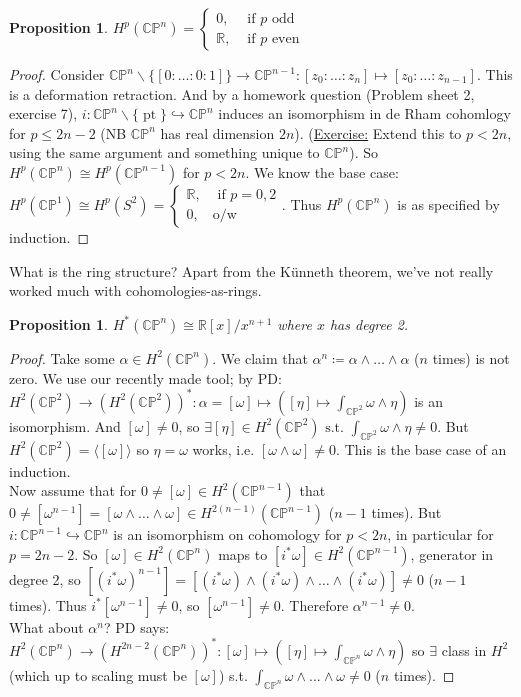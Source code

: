 \documentclass[10pt]{article}
\theoremstyle{plain}
\newtheorem{prop}[thm]{Proposition}
\theoremstyle{definition}
\newcommand{\st}{\text{ s.t. }}
\newcommand{\myif}{\text{ if }}
\newcommand{\Real}{\mathbb{R}}
\newcommand{\CProj}{\mathbb{CP}}
\newcommand{\mycasesthing}[2]{\begin{cases} #1 \\ #2\end{cases}}
\DeclareMathOperator{\pt}{pt}
\begin{document}
\begin{prop}
$H^p(\CProj^n) = \mycasesthing{ 0,& \myif p \text{ odd}}{\Real, & \myif p \text{ even}} $
\end{prop}
\begin{proof}
Consider $\CProj^n \backslash \{ [0:\ldots:0:1]\} \to \CProj^{n-1} : [z_0: \ldots : z_{n}] \mapsto [z_0: \ldots : z_{n-1}]$. This is a deformation retraction. And by a homework question (Problem sheet 2, exercise 7), $i : \CProj ^n \backslash \{\pt\} \hookrightarrow \CProj^n$ induces an isomorphism in de Rham cohomlogy for $p \leq 2n-2$ (NB $\CProj^n$ has real dimension $2n$). (\underline{Exercise:} Extend this to $p<2n$, using the same argument and something unique to $\CProj^n$). So $H^p(\CProj^n) \cong H^p(\CProj^{n-1})$ for $p<2n$. We know the base case: $H^p(\CProj^1) \cong  H^p(S^2) = \mycasesthing{\Real,& \myif p =0,2}{0,& \text{o/w}}$. Thus $H^p(\CProj^n)$ is as specified by induction.
\end{proof}
\noindent
What is the ring structure? Apart from the K\"unneth theorem, we've not really worked much with cohomologies-as-rings.\\
\begin{prop}
   $H^*(\CProj^n) \cong \Real[x] / x^{n+1}$ where $x$ has degree 2.
\end{prop} 
 \begin{proof}
    Take some $\alpha \in H^2(\CProj^n)$. We claim that $\alpha^n \coloneqq \alpha\wedge\ldots\wedge\alpha$ ($n$ times) is not zero. We use our recently made tool; by PD: $H^2(\CProj^2) \to (H^2(\CProj^2))^* : \alpha = [\omega] \mapsto ([\eta] \mapsto \int_{\CProj^2} \omega \wedge \eta)$ is an isomorphism. And $[\omega] \neq 0$, so $\exists [\eta] \in H^2(\CProj^2) \st \int_{\CProj^2} \omega \wedge \eta \neq 0$. But $H^2(\CProj^2) = \langle [\omega]\rangle$ so $\eta = \omega$ works, i.e. $[\omega \wedge \omega] \neq 0$. This is the base case of an induction.\\
    Now assume that for $0\neq [\omega] \in H^2(\CProj^{n-1})$ that $0 \neq[ \omega^{n-1}]= [\omega \wedge \ldots \wedge \omega] \in H^{2(n-1)}(\CProj^{n-1})$ ($n-1$ times). But $i : \CProj^{n-1} \hookrightarrow \CProj^n$ is an isomorphism on cohomology for $p < 2n$, in particular for $p = 2n-2$. So $[\omega] \in H^2(\CProj^n)$ maps to $[i^*\omega] \in H^2(\CProj^{n-1})$, generator in degree 2, so $[(i^*\omega)^{n-1}]= [(i^*\omega) \wedge(i^*\omega) \wedge \ldots \wedge (i^*\omega)] \neq 0$ ($n-1$ times). Thus $i^*[\omega^{n-1}] \neq 0$, so $[\omega^{n-1}] \neq 0$. Therefore $\alpha^{n-1} \neq 0$.  \\
    What about $\alpha^n$? PD says: $H^2(\CProj^n) \to (H^{2n-2}(\CProj^n))^* : [\omega] \mapsto ([\eta] \mapsto \int_{\CProj^n} \omega \wedge \eta)$ so $\exists$ class in $H^2$ (which up to scaling must be $[\omega]$) s.t. $\int_{\CProj^n} \omega \wedge ... \wedge \omega \neq 0$ ($n$ times).
 \end{proof}
\end{document}

